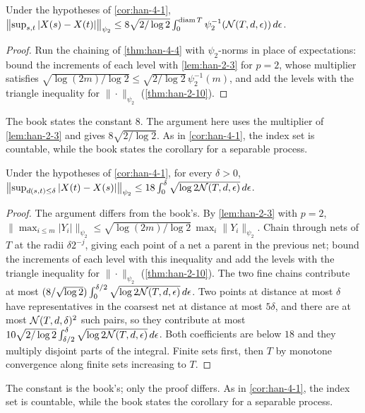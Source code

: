 \begin{corollary}
  \label{cor:han-4-2-global}
  Under the hypotheses of \cref{cor:han-4-1},
  $\bigl\|\sup_{s,t}|X(s)-X(t)|\bigr\|_{\psi_2}\le8\sqrt{2/\log2}\int_0^{\operatorname{diam} T}\psi_2^{-1}(\mathcal{N}(T,d,\epsilon))\,d\epsilon$.
\end{corollary}
\begin{proof}
  Run the chaining of \cref{thm:han-4-4} with $\psi_2$-norms in place of expectations: bound the increments of each level with \cref{lem:han-2-3} for $p=2$, whose multiplier satisfies $\sqrt{\log(2m)/\log2}\le\sqrt{2/\log2}\,\psi_2^{-1}(m)$, and add the levels with the triangle inequality for $\|\cdot\|_{\psi_2}$ (\cref{thm:han-2-10}).
\end{proof}
\begin{remark}
  The book states the constant $8$. The argument here uses the multiplier of \cref{lem:han-2-3} and gives $8\sqrt{2/\log2}$. As in \cref{cor:han-4-1}, the index set is countable, while the book states the corollary for a separable process.
\end{remark}

\begin{corollary}
  \label{cor:han-4-2-local}
  Under the hypotheses of \cref{cor:han-4-1}, for every $\delta>0$,
  $\bigl\|\sup_{d(s,t)\le\delta}|X(t)-X(s)|\bigr\|_{\psi_2}\le18\int_0^\delta\sqrt{\log2\mathcal{N}(T,d,\epsilon)}\,d\epsilon$.
\end{corollary}
\begin{proof}
  The argument differs from the book's. By \cref{lem:han-2-3} with $p=2$, $\|\max_{i\le m}|Y_i|\|_{\psi_2}\le\sqrt{\log(2m)/\log2}\,\max_i\|Y_i\|_{\psi_2}$. Chain through nets of $T$ at the radii $\delta2^{-j}$, giving each point of a net a parent in the previous net; bound the increments of each level with this inequality and add the levels with the triangle inequality for $\|\cdot\|_{\psi_2}$ (\cref{thm:han-2-10}). The two fine chains contribute at most $(8/\sqrt{\log2})\int_0^{\delta/2}\sqrt{\log2\mathcal{N}(T,d,\epsilon)}\,d\epsilon$. Two points at distance at most $\delta$ have representatives in the coarsest net at distance at most $5\delta$, and there are at most $\mathcal{N}(T,d,\delta)^2$ such pairs, so they contribute at most $10\sqrt{2/\log2}\int_{\delta/2}^{\delta}\sqrt{\log2\mathcal{N}(T,d,\epsilon)}\,d\epsilon$. Both coefficients are below $18$ and they multiply disjoint parts of the integral. Finite sets first, then $T$ by monotone convergence along finite sets increasing to $T$.
\end{proof}
\begin{remark}
  The constant is the book's; only the proof differs. As in \cref{cor:han-4-1}, the index set is countable, while the book states the corollary for a separable process.
\end{remark}

